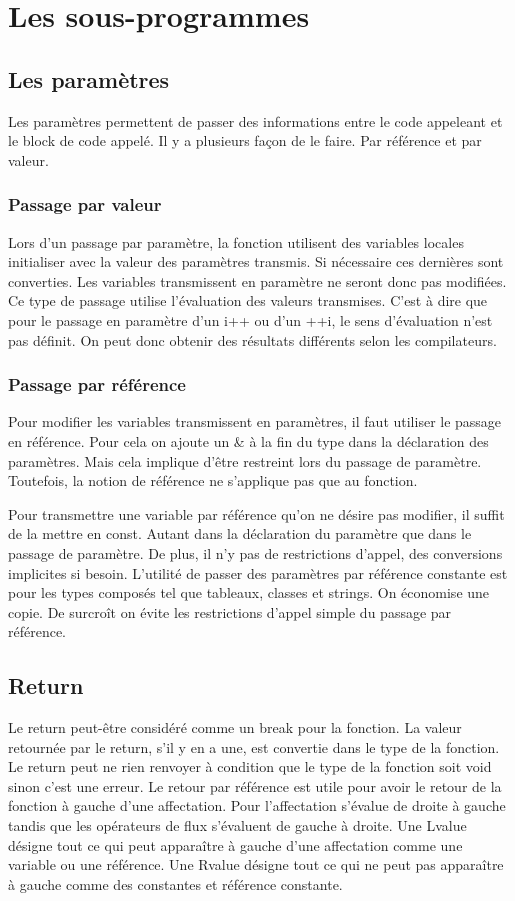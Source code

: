 \documentclass{article}
\begin{document}
\section{Les sous-programmes}
\subsection{Les paramètres}
Les paramètres permettent de passer des informations entre le code appeleant et le block de code appelé. Il y a plusieurs façon de le faire. Par référence et par valeur.

\subsubsection{Passage par valeur}
Lors d'un passage par paramètre, la fonction utilisent des variables locales initialiser avec la valeur des paramètres transmis. Si nécessaire ces dernières sont converties. Les variables transmissent en paramètre ne seront donc pas modifiées.
Ce type de passage utilise l'évaluation des valeurs transmises. C'est à dire que pour le passage en paramètre d'un i++ ou d'un ++i, le sens d'évaluation n'est pas définit. On peut donc obtenir des résultats différents selon les compilateurs.

\subsubsection{Passage par référence}
Pour modifier les variables transmissent en paramètres, il faut utiliser le passage en référence. Pour cela on ajoute un \& à la fin du type dans la déclaration des paramètres. 
Mais cela implique d'être restreint lors du passage de paramètre. Toutefois, la notion de référence ne s'applique pas que au fonction. 

Pour transmettre une variable par référence qu'on ne désire pas modifier, il suffit de la mettre en const. Autant dans la déclaration du paramètre que dans le passage de paramètre. De plus, il n'y pas de restrictions d'appel, des conversions implicites si besoin. L'utilité de passer des paramètres par référence constante est pour les types composés tel que tableaux, classes et strings. On économise une copie. De surcroît on évite les restrictions d'appel simple du passage par référence.
\subsection{Return}
Le return peut-être considéré comme un break pour la fonction. La valeur retournée par le return, s'il y en a une, est convertie dans le type de la fonction. Le return peut ne rien renvoyer à condition que le type de la fonction soit void sinon c'est une erreur. 
Le retour par référence est utile pour avoir le retour de la fonction à gauche d'une affectation. Pour l'affectation s'évalue de droite à gauche tandis que les opérateurs de flux s'évaluent de gauche à droite. Une Lvalue désigne tout ce qui peut apparaître à gauche d'une affectation comme une variable ou une référence. Une Rvalue désigne tout ce qui ne peut pas apparaître à gauche comme des constantes et référence constante. 
\end{document}
